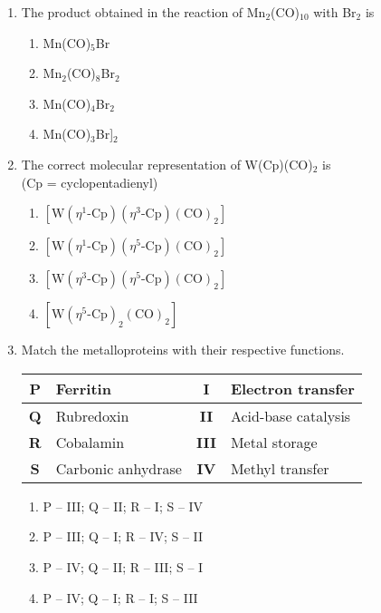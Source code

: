 \documentclass[12pt]{article}
\begin{document}
\begin{enumerate}[label=Q.\arabic*]
		\item The product obtained in the reaction of Mn$_2$(CO)$_{10}$ with Br$_2$ is  
		\begin{enumerate}
		\item Mn(CO)$_5$Br
		\item Mn$_2$(CO)$_8$Br$_2$
		\item Mn(CO)$_4$Br$_2$
		\item Mn(CO)$_3$Br]$_2$
		\end{enumerate}
		\item The correct molecular representation of W(Cp)(CO)$_2$ is \\
			(Cp = cyclopentadienyl)
			\begin{enumerate}
\item \([ \text{W}(\eta^1\text{-Cp})(\eta^3\text{-Cp})(\text{CO})_2 ]\)
\item \([ \text{W}(\eta^1\text{-Cp})(\eta^5\text{-Cp})(\text{CO})_2 ]\)
\item \([ \text{W}(\eta^3\text{-Cp})(\eta^5\text{-Cp})(\text{CO})_2 ]\)
\item \([ \text{W}(\eta^5\text{-Cp})_2(\text{CO})_2 ]\)
	\end{enumerate}

	\item Match the metalloproteins with their respective functions.

	\begin{tabular}{|c|l|c|l|}
	\hline
	\textbf{P} & Ferritin              & \textbf{I}   & Electron transfer     \\
		\hline
		\textbf{Q} & Rubredoxin           & \textbf{II}  & Acid-base catalysis   \\
			\hline
			\textbf{R} & Cobalamin            & \textbf{III} & Metal storage         \\
				\hline
				\textbf{S} & Carbonic anhydrase   & \textbf{IV}  & Methyl transfer       \\
					\hline
					\end{tabular}


					\begin{enumerate}
					\item P – III; Q – II; R – I; S – IV
					\item P – III; Q – I; R – IV; S – II
					\item P – IV; Q – II; R – III; S – I
					\item P – IV; Q – I; R – I; S – III
					\end{enumerate}


\end{enumerate}
\end{document}
